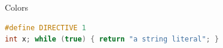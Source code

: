 \documentclass[aspectratio=169,10pt]{beamer}
\begin{document}
\begin{frame}[fragile]{Colors}
	\begin{lstlisting}[language=C++]
#define DIRECTIVE 1
int x; while (true) { return "a string literal"; }
	\end{lstlisting}
\end{frame}
\end{document}
